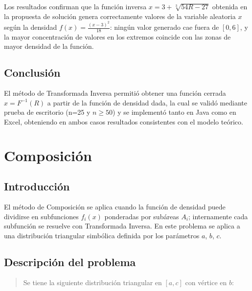 \documentclass[12pt, a4paper]{article}
\begin{document}
Los resultados confirman que la función inversa $x = 3 + \sqrt[3]{54R-27}$ obtenida en la propuesta de solución genera correctamente valores de la variable aleatoria $x$ según la densidad $f(x) = \frac{(x-3)^2}{18}$: ningún valor generado cae fuera de $[0,6]$, y la mayor concentración de valores en los extremos coincide con las zonas de mayor densidad de la función.

\subsection{Conclusión}

El método de Transformada Inversa permitió obtener una función cerrada $x=F^{-1}(R)$ a partir de la función de densidad dada, la cual se validó mediante prueba de escritorio (n=25 y $n \geq 50$) y se implementó tanto en Java como en Excel, obteniendo en ambos casos resultados consistentes con el modelo teórico.


\newpage

\section{Composición}

\subsection{Introducción}

El método de Composición se aplica cuando la función de densidad puede dividirse en subfunciones $f_i(x)$ ponderadas por subáreas $A_i$; internamente cada subfunción se resuelve con Transformada Inversa. En este problema se aplica a una distribución triangular simbólica definida por los parámetros $a$, $b$, $c$.

\subsection{Descripción del problema}

\begin{quote}
Se tiene la siguiente distribución triangular en $[a,c]$ con vértice en $b$:
\end{quote}

\begin{center}
\shorthandoff{>}
\shorthandon{>}
\end{center}
\end{document}
